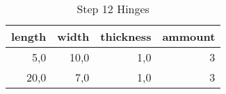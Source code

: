 \begin{table}[h!]
\centering
\caption{Step 12 Hinges}
\begin{tabular}{rrrr}
\toprule
 length &  width &  thickness &  ammount \\
\midrule
    5,0 &   10,0 &        1,0 &        3 \\
   20,0 &    7,0 &        1,0 &        3 \\
\bottomrule
\end{tabular}
\end{table}
